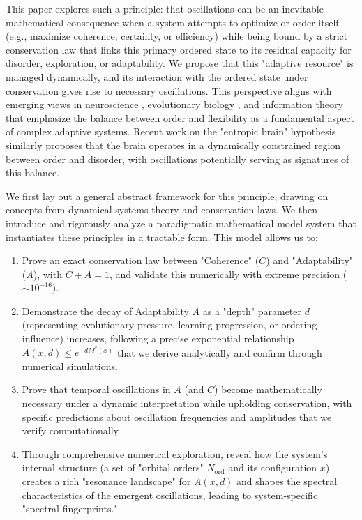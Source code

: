 \documentclass[11pt,a4paper]{article}
\begin{document}
This paper explores such a principle: that oscillations can be an inevitable mathematical consequence when a system attempts to optimize or order itself (e.g., maximize coherence, certainty, or efficiency) while being bound by a strict conservation law that links this primary ordered state to its residual capacity for disorder, exploration, or adaptability. We propose that this "adaptive resource" is managed dynamically, and its interaction with the ordered state under conservation gives rise to necessary oscillations. This perspective aligns with emerging views in neuroscience \cite{Friston2010,Friston2019,Parr2020}, evolutionary biology \cite{Whitacre2010,Gao2016}, and information theory \cite{Tononi1994,Sporns2000,Mora2011} that emphasize the balance between order and flexibility as a fundamental aspect of complex adaptive systems. Recent work on the "entropic brain" hypothesis \cite{Carhart-Harris2014,Carhart-Harris2018} similarly proposes that the brain operates in a dynamically constrained region between order and disorder, with oscillations potentially serving as signatures of this balance.

We first lay out a general abstract framework for this principle, drawing on concepts from dynamical systems theory and conservation laws. We then introduce and rigorously analyze a paradigmatic mathematical model system that instantiates these principles in a tractable form. This model allows us to:
\begin{enumerate}
    \item Prove an exact conservation law between "Coherence" ($C$) and "Adaptability" ($A$), with $C+A=1$, and validate this numerically with extreme precision ($\sim 10^{-16}$).
    \item Demonstrate the decay of Adaptability $A$ as a "depth" parameter $d$ (representing evolutionary pressure, learning progression, or ordering influence) increases, following a precise exponential relationship $A(x,d) \leq e^{-d M^*(x)}$ that we derive analytically and confirm through numerical simulations.
    \item Prove that temporal oscillations in $A$ (and $C$) become mathematically necessary under a dynamic interpretation while upholding conservation, with specific predictions about oscillation frequencies and amplitudes that we verify computationally.
    \item Through comprehensive numerical exploration, reveal how the system's internal structure (a set of "orbital orders" $N_{\text{ord}}$ and its configuration $x$) creates a rich "resonance landscape" for $A(x,d)$ and shapes the spectral characteristics of the emergent oscillations, leading to system-specific "spectral fingerprints."
\end{enumerate}
\end{document}

